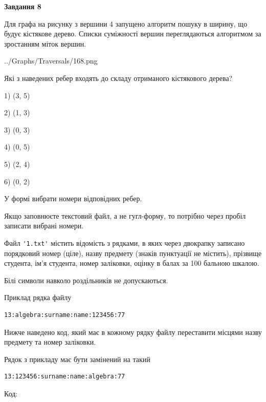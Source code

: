 \documentclass[12pt, ukrainian]{article}
\def\code#1{\Verb!#1!}
\begin{document}
{\begin {large}
{\begin {center}\textbf{Завдання 8}\end {center}}\par
Для графа на рисунку з вершини 4 запущено алгоритм пошуку в ширину, що будує кістякове дерево. Списки суміжності вершин переглядаються алгоритмом за зростанням міток вершин.\par
\begin{center}
	{../Graphs/Traversals/168.png}
\end{center}
\par Які з наведених ребер входять до складу отриманого кістякового дерева?\par
1) (3, 5)\par
2) (1, 3)\par
3) (0, 3)\par
4) (0, 5)\par
5) (2, 4)\par
6) (0, 2)\par
{\vskip 15pt} У формі вибрати номери відповідних ребер.


Якщо заповнюєте текстовий файл, а не гугл-форму, то потрібно через пробіл записа\-ти вибрані номери.\par
\newpage


Файл \code{'1.txt'} містить відомість з рядками, в яких через двокрапку записано поряд\-ковий номер (ціле), назву предмету (знаків пунктуації не містить), прізвище студента, ім'я студента, номер заліковки, оцінку в балах за 100 бальною шкалою.

Білі символи навколо роздільників не допускаються.

Приклад рядка файлу



\begin{verbatim}
13:algebra:surname:name:123456:77
\end{verbatim}


Нижче наведено код, який має в кожному рядку файлу переставити місцями назву предмету та номер заліковки.

Рядок з прикладу має бути замінений на такий



\begin{verbatim}
13:123456:surname:name:algebra:77
\end{verbatim}




Код:




\end{large}}
\end{document}

